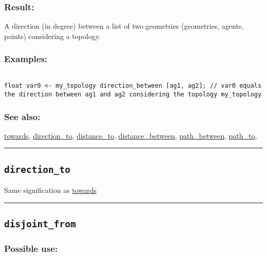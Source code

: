 \documentclass[]{book}
\theoremstyle{definition}
\theoremstyle{definition}
\theoremstyle{definition}
\theoremstyle{remark}
\begin{document}
\subsubsection{Result:}\label{result-129}

A direction (in degree) between a list of two geometries (geometries,
agents, points) considering a topology.

\subsubsection{Examples:}\label{examples-100}

\begin{verbatim}
 
float var0 <- my_topology direction_between [ag1, ag2]; // var0 equals the direction between ag1 and ag2 considering the topology my_topology
\end{verbatim}

\subsubsection{See also:}\label{see-also-78}

\href{OperatorsSZ\#towards}{towards},
\href{OperatorsDH\#direction_to}{direction\_to},
\href{OperatorsDH\#distance_to}{distance\_to},
\href{OperatorsDH\#distance_between}{distance\_between},
\href{OperatorsNR\#path_between}{path\_between},
\href{OperatorsNR\#path_to}{path\_to},

\begin{center}\rule{0.5\linewidth}{\linethickness}\end{center}

\subsection{\texorpdfstring{\texttt{direction\_to}}{direction\_to}}\label{direction_to}

Same signification as \href{OperatorsSZ\#towards}{towards}

\begin{center}\rule{0.5\linewidth}{\linethickness}\end{center}

\subsection{\texorpdfstring{\texttt{disjoint\_from}}{disjoint\_from}}\label{disjoint_from}

\subsubsection{Possible use:}\label{possible-use-134}
\end{document}
